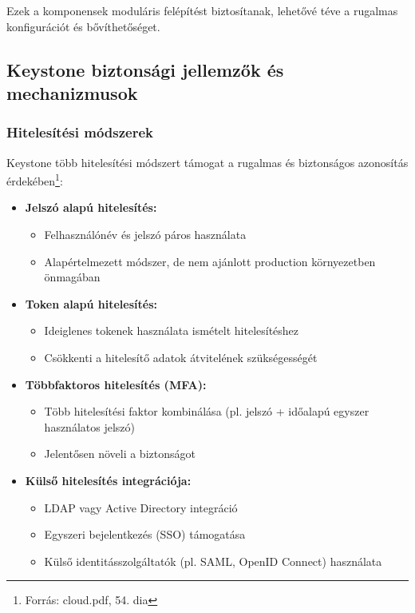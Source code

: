 \documentclass[a4paper,12pt]{article}
\begin{document}
    Ezek a komponensek moduláris felépítést biztosítanak, lehetővé téve a rugalmas konfigurációt és bővíthetőséget.

    \subsection{Keystone biztonsági jellemzők és mechanizmusok}

    \subsubsection{Hitelesítési módszerek}

    Keystone több hitelesítési módszert támogat a rugalmas és biztonságos azonosítás érdekében\footnote{Forrás: cloud.pdf, 54. dia}:

    \begin{itemize}
        \item \textbf{Jelszó alapú hitelesítés:}
        \begin{itemize}
            \item Felhasználónév és jelszó páros használata
            \item Alapértelmezett módszer, de nem ajánlott production környezetben önmagában
        \end{itemize}

        \item \textbf{Token alapú hitelesítés:}
        \begin{itemize}
            \item Ideiglenes tokenek használata ismételt hitelesítéshez
            \item Csökkenti a hitelesítő adatok átvitelének szükségességét
        \end{itemize}

        \item \textbf{Többfaktoros hitelesítés (MFA):}
        \begin{itemize}
            \item Több hitelesítési faktor kombinálása (pl. jelszó + időalapú egyszer használatos jelszó)
            \item Jelentősen növeli a biztonságot
        \end{itemize}

        \item \textbf{Külső hitelesítés integrációja:}
        \begin{itemize}
            \item LDAP vagy Active Directory integráció
            \item Egyszeri bejelentkezés (SSO) támogatása
            \item Külső identitásszolgáltatók (pl. SAML, OpenID Connect) használata
        \end{itemize}
    \end{itemize}
\end{document}
